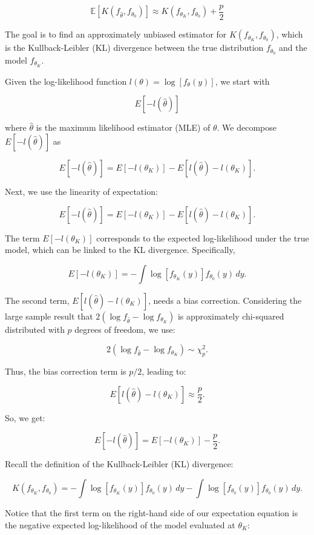 \documentclass[
11pt, %
oneside, %
english, %
singlespacing, %
]{macthesis} %
\begin{document}
\begin{equation}
\mathbb{E}[K(f_{\hat{\theta}}, f_{\theta_0})] \approx K(f_{\theta_K}, f_{\theta_0}) + \frac{p}{2} 
\label{eq:KL approx}
\end{equation}

The goal is to find an approximately unbiased estimator for \(K(f_{\theta_K}, f_{\theta_0})\), which is the Kullback-Leibler (KL) divergence between the true distribution \(f_{\theta_0}\) and the model \(f_{\theta_K}\).

Given the log-likelihood function \(l(\theta) = \log[f_{\theta}(y)]\), we start with

\[
E[-l(\hat{\theta})]
\]

where \(\hat{\theta}\) is the maximum likelihood estimator (MLE) of \(\theta\). We decompose \(E[-l(\hat{\theta})]\) as

\[
E[-l(\hat{\theta})] = E[-l(\theta_K)] - E[l(\hat{\theta}) - l(\theta_K)].
\]

Next, we use the linearity of expectation:

\[
E[-l(\hat{\theta})] = E[-l(\theta_K)] - E[l(\hat{\theta}) - l(\theta_K)]. 
\]

The term \(E[-l(\theta_K)]\) corresponds to the expected log-likelihood under the true model, which can be linked to the KL divergence. Specifically,

\[
E[-l(\theta_K)] = -\int \log[f_{\theta_K}(y)] f_{\theta_0}(y) \, dy. 
\]

The second term, \(E[l(\hat{\theta}) - l(\theta_K)]\), needs a bias correction. Considering the large sample result that \(2 (\log f_{\hat{\theta}} - \log f_{\theta_K})\) is approximately chi-squared distributed with \(p\) degrees of freedom, we use:

\[
2 (\log f_{\hat{\theta}} - \log f_{\theta_K}) \sim \chi^2_p.
\]

Thus, the bias correction term is \(p/2\), leading to:

\[
E[l(\hat{\theta}) - l(\theta_K)] \approx \frac{p}{2}. 
\]

So, we get:

\[
E[-l(\hat{\theta})] = E[-l(\theta_K)] - \frac{p}{2}.
\]

Recall the definition of the Kullback-Leibler (KL) divergence:

\[ 
K(f_{\theta_K}, f_{\theta_0}) = -\int \log[f_{\theta_K}(y)] f_{\theta_0}(y) \, dy - \int \log[f_{\theta_0}(y)] f_{\theta_0}(y) \, dy.
\]

Notice that the first term on the right-hand side of our expectation equation is the negative expected log-likelihood of the model evaluated at \(\theta_K\):
\end{document}

